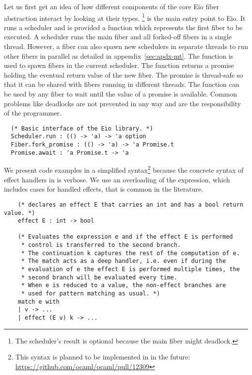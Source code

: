 Let us first get an idea of how different components of the core Eio fiber abstraction interact by looking at their types.
\footnote{The scheduler's result is optional because the main fiber might deadlock.} is the main entry point to Eio.
It runs a scheduler and is provided a function which represents the first fiber to be executed.
A scheduler runs the main fiber and all forked-off fibers in a single thread.
However, a fiber can also spawn new schedulers in separate threads to run other fibers in parallel as detailed in appendix~\ref{sec:apdx-mt}.
The  function is used to spawn fibers in the current scheduler.
The function returns a promise holding the eventual return value of the new fiber.
The promise is thread-safe so that it can be shared with fibers running in different threads.
The  function can be used by any fiber to wait until the value of a promise is available.
Common problems like deadlocks are not prevented in any way and are the responsibility of the programmer.


\begin{verbatim}
  (* Basic interface of the Eio library. *)
  Scheduler.run : (() -> 'a) -> 'a option
  Fiber.fork_promise : (() -> 'a) -> 'a Promise.t
  Promise.await : 'a Promise.t -> 'a
\end{verbatim}

We present code examples in a simplified syntax\footnote{This syntax is planned to be implemented in \ocf{} in the future: \url{https://github.com/ocaml/ocaml/pull/12309}} because the concrete syntax of effect handlers in \ocf{} is verbose.
We use an overloading of the  expression, which includes cases for handled effects, that is common in the literature.

\begin{verbatim}
    (* declares an effect E that carries an int and has a bool return value. *)
    effect E : int -> bool

    (* Evaluates the expression e and if the effect E is performed 
     * control is transferred to the second branch.
     * The continuation k captures the rest of the computation of e.
     * The match acts as a deep handler, i.e. even if during the 
     * evaluation of e the effect E is performed multiple times, the
     * second branch will be evaluated every time.
     * When e is reduced to a value, the non-effect branches are 
     * used for pattern matching as usual. *)
    match e with
    | v -> ...
    | effect (E v) k -> ...
\end{verbatim}

